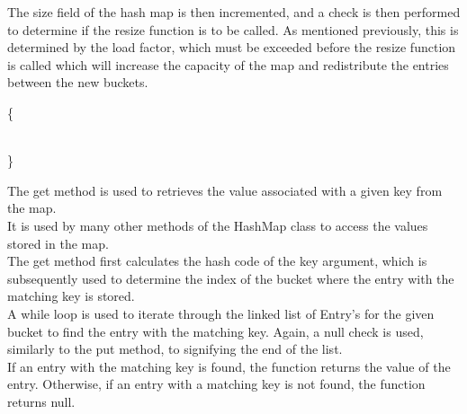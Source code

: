 \documentclass[a4paper]{article}
\begin{document}
The size field of the hash map is then incremented, 
and a check is then performed to determine if the resize function is to be called.
As mentioned previously, this is determined by the load factor, 
which must be exceeded before the resize function is called
which will increase the capacity of the map and redistribute the entries 
between the new buckets.

\pagebreak





\vspace{4mm}
\makeatletter
\renewcommand{\ALG@name}{Hashmap Method}
\makeatother

\begin{algorithm}
\caption{}\label{euclid}
\begin{algorithmic}[1]

\algrenewcommand{}
 {\{}
\State{}
\State\quad{}
\State\quad{\tt \} }
\State{}
\State{\tt \} }


\\
{\}}
\EndProcedure
\end{algorithmic}
\end{algorithm}

The get method is used to retrieves the value associated with a given key from the map. \\

It is used by many other methods of the HashMap class to access the values stored in the map. \\

The get method first calculates the hash code of the key argument,
which is subsequently used to determine the index of the bucket where the entry with the matching key is stored. \\

A while loop is used to iterate through the linked list of Entry's for the given bucket to find the entry with the matching key. 
Again, a null check is used, similarly to the put method, to signifying the end of the list. \\

If an entry with the matching key is found, the function returns the value of the entry. 
Otherwise, if an entry with a matching key is not found, the function returns null.
\end{document}
